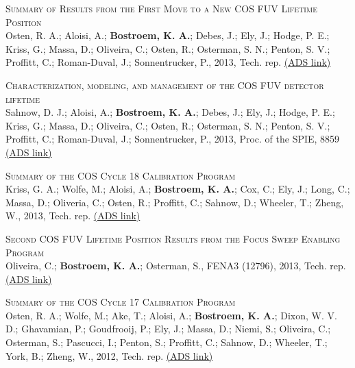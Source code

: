 \begin{revnumerate}[24]
\item{\textsc{Summary of Results from the First Move to a New COS FUV Lifetime Position}\\
Osten, R. A.; Aloisi, A.; \textbf{Bostroem, K. A.};  Debes, J.; Ely, J.; Hodge, P. E.; Kriss, G.; Massa, D.; Oliveira, C.; Osten, R.; Osterman, S. N.; Penton, S. V.; Proffitt, C.; Roman-Duval, J.; Sonnentrucker, P., 2013, Tech. rep. 
\color{blue}\href{https://ui.adsabs.harvard.edu/abs/2013cos..rept...16O/abstract}{(ADS link)}\color{black}}\\ %

\item{\textsc{Characterization, modeling, and management of the COS FUV detector lifetime}\\
Sahnow, D. J.; Aloisi, A.; \textbf{Bostroem, K. A.}; Debes, J.; Ely, J.; Hodge, P. E.; Kriss, G.; Massa, D.; Oliveira, C.; Osten, R.; Osterman, S. N.; Penton, S. V.; Proffitt, C.; Roman-Duval, J.; Sonnentrucker, P., 2013, Proc. of the SPIE, 8859 
\color{blue}\href{https://ui.adsabs.harvard.edu/abs/2013SPIE.8859E..0SS/abstract}{(ADS link)}\color{black}}\\

\item{\textsc{Summary of the COS Cycle 18 Calibration Program}\\
Kriss, G. A.; Wolfe, M.; Aloisi, A.; \textbf{Bostroem, K. A.}; Cox, C.; Ely, J.; Long, C.; Massa, D.; Oliveria, C.; Osten, R.; Proffitt, C.; Sahnow, D.; Wheeler, T.; Zheng, W., 2013, Tech. rep. 
\color{blue}\href{https://ui.adsabs.harvard.edu/abs/2013cos..rept....4K/abstract}{(ADS link)}\color{black}}\\ %

\item{\textsc{Second COS FUV Lifetime Position Results from the Focus Sweep Enabling Program}\\
Oliveira, C.; \textbf{Bostroem, K. A.}; Osterman, S., FENA3 (12796), 2013, Tech. rep. 
\color{blue}\href{https://ui.adsabs.harvard.edu/abs/2013cos..rept....1O/abstract}{(ADS link)}\color{black}}\\ %

\item{\textsc{Summary of the COS Cycle 17 Calibration Program}\\
Osten, R. A.; Wolfe, M.; Ake, T.; Aloisi, A.; \textbf{Bostroem, K. A.}; Dixon, W. V. D.; Ghavamian, P.; Goudfrooij, P.; Ely, J.; Massa, D.; Niemi, S.; Oliveira, C.; Osterman, S.; Pascucci, I.; Penton, S.; Proffitt, C.; Sahnow, D.; Wheeler, T.; York, B.; Zheng, W., 2012, Tech. rep. 
\color{blue}\href{https://ui.adsabs.harvard.edu/abs/2012cos..rept....2O/abstract}{(ADS link)}\color{black}}\\ %


\end{revnumerate}
